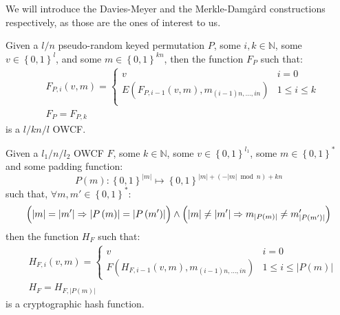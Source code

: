 We will introduce the Davies-Meyer and the Merkle-Damg\r{a}rd constructions respectively, as
those are the ones of interest to us.
\begin{theorem}
	Given a \(l/n\) pseudo-random keyed permutation \(P\), some \(i, k \in \mathbb{N}\), some
	\(v \in {\left\{0, 1\right\}}^l\), and some \(m \in {\left\{0, 1\right\}}^{kn}\), then the
	function \(F_P\) such that:
	\begin{align*}
		 & F_{P,i}\left(v, m\right) =
		\begin{cases}
			v                                                                         & i = 0
			\\
			E\left(F_{P, i-1}\left(v, m\right), m_{\left(i-1\right)n,\dots,in}\right) & 1 \le
			i \le k
			\\
		\end{cases} \\
		 & F_P = F_{P, k}
	\end{align*}
	is a \(l/kn/l\) OWCF\@.
\end{theorem}
\begin{theorem}
	Given a \(l_1/n/l_2\) OWCF \(F\), some \(k \in \mathbb{N}\), some
	\(v \in {\left\{0, 1\right\}}^{l_1}\), some \(m \in {\left\{0, 1\right\}}^*\) and some padding
	function:
	\[
		P\left(m\right)\colon {\left\{0, 1\right\}}^{\left|m\right|} \mapsto
		{\left\{0, 1\right\}}^{\left|m\right| + \left(-\left|m\right| \bmod n\right) + kn}
	\]
	such that, \(\forall m, m' \in {\left\{0, 1\right\}}^*\colon \)
	\[
		\Bigl(\left|m\right| = \left|m'\right| \Rightarrow \left|P\left(m\right)\right| =
		\left|P\left(m'\right)\right|\Bigr) \land
		\left(\left|m\right| \neq \left|m'\right| \Rightarrow m_{\left|P\left(m\right)\right|} \neq
		m'_{\left|P\left(m'\right)\right|}\right)
	\]
	then the function \(H_F\) such that:
	\begin{align*}
		 & H_{F, i}\left(v, m\right) =
		\begin{cases}
			v                                                                         & i = 0   \\
			F\left(H_{F, i-1}\left(v, m\right), m_{\left(i-1\right)n,\dots,in}\right) & 1 \le i
			\le \left|P\left(m\right)\right|
		\end{cases} \\
		 & H_F = H_{F, \left|P\left(m\right)\right|}
	\end{align*}
	is a cryptographic hash function.
\end{theorem}
